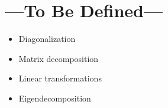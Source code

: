 
\chapter{---To Be Defined---}\label{tbd}
\begin{itemize}
  \item Diagonalization
  \item Matrix decomposition
  \item Linear transformations
  \item Eigendecomposition
\end{itemize}